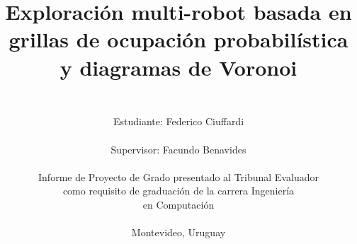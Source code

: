 \documentclass{report}
\renewcommand\_{\textunderscore\allowbreak}
\begin{document}

\title{%
\begin{figure}[H]
\vspace{-2.5cm}
  \subfloat{\hspace{0.075\textwidth}}
  \subfloat{\hspace{0.2\textwidth}}
  \subfloat{\hspace{0.2\textwidth}}
\end{figure}
\vspace{0.25cm}
\huge
Exploración multi-robot basada en grillas de ocupación probabilística y diagramas de Voronoi\\
}

\author{%
\vspace{7.0cm}\\
\Large
Estudiante: Federico Ciuffardi\\
\vspace{0.25cm}\\
\Large
Supervisor: Facundo Benavides\\
\vspace{0.5cm}\\
Informe de Proyecto de Grado presentado al Tribunal Evaluador\\
como requisito de graduación de la carrera Ingeniería\\
en Computación\\
\vspace{0.5cm}\\
Montevideo, Uruguay%
}
\end{document}
